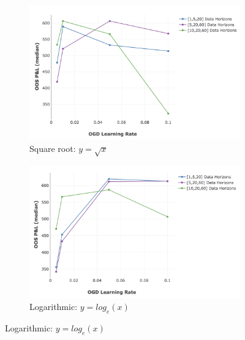 \documentclass[a4paper,11pt,oneside]{article}
\theoremstyle{plain}
\theoremstyle{definition}
\begin{document}
\begin{figure}
			\begin{subfigure}{0.45\linewidth}
				\centering\includegraphics[scale=0.3]{images/results/primary/OOS_OGDLR_Delta_Encoding_10_median.png}
				\caption{Square root: $y=\sqrt{x}$}
			\end{subfigure}%
			\begin{subfigure}{0.49\linewidth}
				\centering\includegraphics[scale=0.3]{images/results/primary/OOS_OGDLR_Delta_Encoding_5_median.png}
				\caption{Logarithmic: $y=log_{e}(x)$}
			\end{subfigure}
		\end{figure}
		
				\newpage
		
		
			
\end{document}
